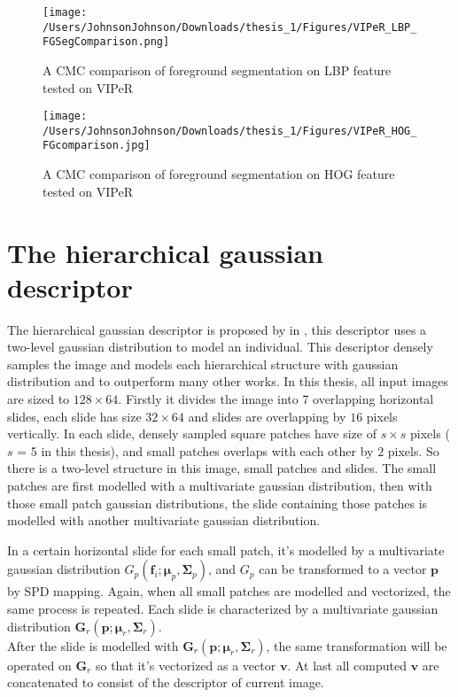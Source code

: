 \begin{figure}[H]
\centering
\texttt{[image: /Users/JohnsonJohnson/Downloads/thesis\_1/Figures/VIPeR\_LBP\_FGSegComparison.png]}
\caption{A CMC comparison of foreground segmentation on LBP feature tested on VIPeR }
\label{fig:SegLBP}
\vspace{-1em}
\end{figure} 

\begin{figure}[H]
\centering
\texttt{[image: /Users/JohnsonJohnson/Downloads/thesis\_1/Figures/VIPeR\_HOG\_FGcomparison.jpg]}
\caption{A CMC comparison of foreground segmentation on HOG feature tested on VIPeR}
\label{fig:SegHOG}
\vspace{-1em}
\end{figure} 



\section{The hierarchical gaussian descriptor}

The hierarchical gaussian descriptor is proposed by in  \cite{GOG}, this descriptor uses a two-level gaussian distribution to model an individual. This descriptor densely samples the image and models each hierarchical structure with gaussian distribution and to outperform many other works. In this thesis, all input images are sized to $128\times 64$. Firstly it divides the image into 7 overlapping horizontal slides, each slide has size $32\times 64$ and slides are overlapping by $16$ pixels vertically.  In each slide, densely sampled square patches have size of $s\times s$ pixels ($s$ = 5 in this thesis), and small patches overlaps with each other by $2$ pixels. So there is a  two-level structure in this image, small patches and slides. The small patches are first modelled with a multivariate gaussian distribution, then with those small patch gaussian distributions, the slide containing those patches is modelled with another multivariate gaussian distribution.

In a certain horizontal slide for each small patch, it's modelled by a multivariate gaussian distribution $G_p(\bm{f}_i;\bm{\mu}_p,\bm{\Sigma}_p)$, and $G_p$ can be transformed to a vector $\bm{p}$ by SPD mapping. Again, when all small patches are modelled and vectorized, the same process is repeated. Each slide is characterized by a multivariate gaussian distribution $\bm{G}_r(\bm{p};\bm{\mu}_r,\bm{\Sigma}_r)$.\\
\indent After the slide is modelled with $\bm{G}_r(\bm{p};\bm{\mu}_r,\bm{\Sigma}_r)$, the same transformation will be operated on $\bm{G}_r$ so that it's vectorized as a vector $\bm{v}$. At last all computed $\bm{v}$ are concatenated to consist of the descriptor of current image. 

